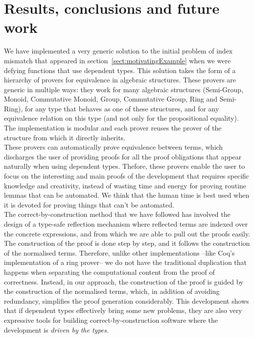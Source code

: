 \section{Results, conclusions and future work}

We have implemented a very generic solution to the initial problem of index mismatch that appeared in section~\ref{sect:motivatingExample} when we were defying functions that use dependent types. This solution takes the form of a hierarchy of provers for equivalence in algebraic structures. These provers are generic in multiple ways: they work for many algebraic structures (Semi-Group, Monoid, Commutative Monoid, Group, Commutative Group, Ring and Semi-Ring), for any type that behaves as one of these structures, and for any equivalence relation on this type (and not only for the propositional equality). The implementation is modular and each prover reuses the prover of the structure from which it directly inherits. \\

These provers can automatically prove equivalence between terms, which discharges the user of providing proofs for all the proof obligations that appear naturally when using dependent types. Thefore, these provers enable the user to focus on the interesting and main proofs of the development that requires specific knowledge and creativity, instead of wasting time and energy for proving routine lemmas that can be automated. We think that the human time is best used when it is devoted for proving things that can't be automated. \\

The correct-by-construction method that we have followed has involved the design of a type-safe reflection mechanism where reflected terms are indexed over the concrete expressions, and from which we are able to pull out the proofs easily. The construction of the proof is done step by step, and it follows the construction of the normalised terms. Therefore, unlike other implementations --like Coq's implementation of a ring prover-- we do not have the traditional duplication that happens when separating the computational content from the proof of correctness. Instead, in our approach, the construction of the proof is guided by the construction of the normalised terms, which, in addition of avoiding redundancy, simplifies the proof generation considerably. This development shows that if dependent types effectively bring some new problems, they are also very expressive tools for building correct-by-construction software where the development is \emph{driven by the types}. \\

